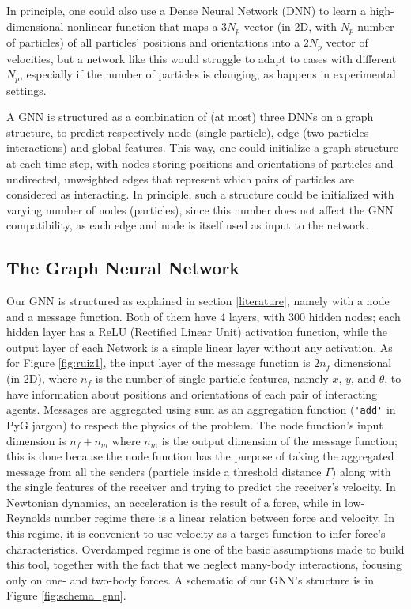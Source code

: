 \documentclass[../../master_thesis_np.tex]{subfiles}
\begin{document}
In principle, one could also use a Dense Neural Network (DNN) to learn a high-dimensional nonlinear function that maps a $3N_p$ vector (in 2D, with $N_p$ number of particles) of all particles' positions and orientations into a $2N_p$ vector of velocities, but a network like this would struggle to adapt to cases with different $N_p$, especially if the number of particles is changing, as happens in experimental settings. 

A GNN is structured as a combination of (at most) three DNNs on a graph structure, to predict respectively node (single particle), edge (two particles interactions) and global features.
This way, one could initialize a graph structure at each time step, with nodes storing positions and orientations of particles and undirected, unweighted edges that represent which pairs of particles are considered as interacting.
In principle, such a structure could be initialized with varying number of nodes (particles), since this number does not affect the GNN compatibility, as each edge and node is itself used as input to the network.

\subsection{The Graph Neural Network}
Our GNN is structured as explained in section \ref{literature}, namely with a node and a message function. 
Both of them have 4 layers, with 300 hidden nodes; each hidden layer has a ReLU (Rectified Linear Unit) activation function, while the output layer of each Network is a simple linear layer without any activation.
As for Figure \ref{fig:ruiz1}, the input layer of the message function is $2n_f$ dimensional (in 2D), where $n_f$ is the number of single particle features, namely $x$, $y$, and $\theta$, to have information about positions and orientations of each pair of interacting agents.
Messages are aggregated using sum as an aggregation function (\verb|'add'| in PyG jargon) to respect the physics of the problem.
The node function's input dimension is $n_f + n_m$ where $n_m$ is the output dimension of the message function; this is done because the node function has the purpose of taking the aggregated message from all the senders (particle inside a threshold distance $\Gamma$) along with the single features of the receiver and trying to predict the receiver's velocity.
In Newtonian dynamics, an acceleration is the result of a force, while in low-Reynolds number regime there is a linear relation between force and velocity.
In this regime, it is convenient to use velocity as a target function to infer force's characteristics.
Overdamped regime is one of the basic assumptions made to build this tool, together with the fact that we neglect many-body interactions, focusing only on one- and two-body forces.
A schematic of our GNN's structure is in Figure \ref{fig:schema_gnn}.
\end{document}
